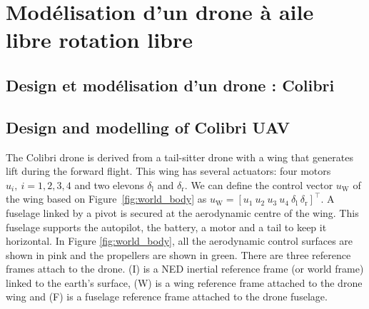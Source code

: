 \chapter{Modélisation d'un drone à aile libre rotation libre}
\minitoc

\section{Design et modélisation d'un drone : Colibri}
\section{Design and modelling of Colibri UAV}\label{sec:model}
The Colibri drone is derived from a tail-sitter drone with a wing that generates lift during the forward flight. This wing has several actuators: four motors $u_{i}, ~i = 1,2,3,4$ and two elevons $\delta_{\text{l}}$ and $\delta_{\text{r}}$. We can define the control vector $u_{\text{W}}$ of the wing based on Figure~\ref{fig:world_body} as $u_{\text{W}} = [u_{1}~u_{2}~u_{3}~u_{4}~\delta_{\text{l}}~\delta_{\text{r}}]^\top$. A fuselage linked by a pivot is secured at the aerodynamic centre of the wing. This fuselage supports the autopilot, the battery, a motor and a tail to keep it horizontal. In Figure \ref{fig:world_body}, all the aerodynamic control surfaces are shown in pink and the propellers are shown in green.
There are three reference frames attach to the drone. (I) is a NED inertial reference frame (or world frame) linked to the earth's surface, (W) is a wing reference frame attached to the drone wing and (F) is a fuselage reference frame attached to the drone fuselage.




